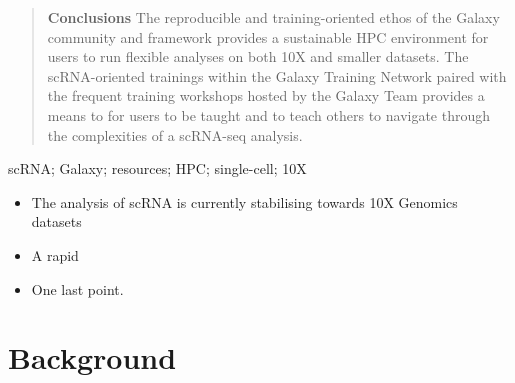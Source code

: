\documentclass[a4paper,num-refs]{oup-contemporary}
\begin{document}
\begin{frontmatter}
\begin{abstract}
\textbf{Conclusions}
The reproducible and training-oriented ethos of the Galaxy community and framework provides a sustainable HPC environment for users to run flexible analyses on both 10X and smaller datasets. The scRNA-oriented trainings within the Galaxy Training Network paired with the frequent training workshops hosted by the Galaxy Team provides a means to for users to be taught and to teach others to navigate through the complexities of a scRNA-seq analysis.
\end{abstract}

\begin{keywords}
scRNA; Galaxy; resources; HPC; single-cell; 10X
\end{keywords}
\end{frontmatter}

\begin{keypoints*}
\begin{itemize}
\item The analysis of scRNA is currently stabilising towards 10X Genomics datasets
\item A rapid
\item One last point.
\end{itemize}
\end{keypoints*}

\section{Background}
\end{document}
